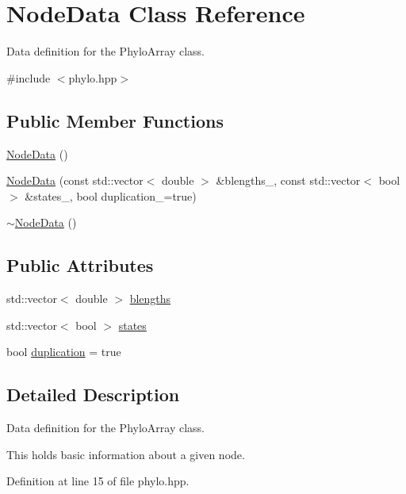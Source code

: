 \hypertarget{class_node_data}{}\section{Node\+Data Class Reference}
\label{class_node_data}


Data definition for the {\ttfamily Phylo\+Array} class.  




{\ttfamily \#include $<$phylo.\+hpp$>$}

\subsection*{Public Member Functions}
\begin{DoxyCompactItemize}
\item 
\hyperlink{class_node_data_a56da12a9de7c80c25a905012749c8671}{Node\+Data} ()
\item 
\hyperlink{class_node_data_a0a90191ba4c987afa3406f829967d8e2}{Node\+Data} (const std\+::vector$<$ double $>$ \&blengths\+\_\+, const std\+::vector$<$ bool $>$ \&states\+\_\+, bool duplication\+\_\+=true)
\item 
\hyperlink{class_node_data_ad870d466c40b9be96ad79adccab79038}{$\sim$\+Node\+Data} ()
\end{DoxyCompactItemize}
\subsection*{Public Attributes}
\begin{DoxyCompactItemize}
\item 
std\+::vector$<$ double $>$ \hyperlink{class_node_data_a02da5f097c105813216d87ef89ad7bd4}{blengths}
\item 
std\+::vector$<$ bool $>$ \hyperlink{class_node_data_a33caaadde6afe892624501bdb0edaea6}{states}
\item 
bool \hyperlink{class_node_data_a6c21d52091bb4fa6e3d431856da17caa}{duplication} = true
\end{DoxyCompactItemize}


\subsection{Detailed Description}
Data definition for the {\ttfamily Phylo\+Array} class. 

This holds basic information about a given node. 

Definition at line 15 of file phylo.\+hpp.



